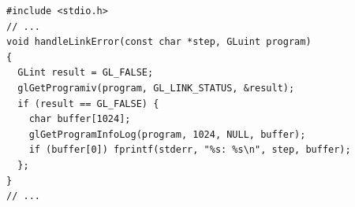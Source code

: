 \documentclass[calcdimensions,landscape,letterpaper]{powersem}
\newcommand{\thecurrentheading}{}
\newcommand{\heading}[1]{\renewcommand{\thecurrentheading}{#1}}
\begin{document}
\begin{slide}
    \heading{Minimal Pipeline: Link Errors}
    \begin{center}
        \begin{minipage}[c]{.95\textwidth}
            \begin{verbatim}
#include <stdio.h>
// ...
void handleLinkError(const char *step, GLuint program)
{
  GLint result = GL_FALSE;
  glGetProgramiv(program, GL_LINK_STATUS, &result);
  if (result == GL_FALSE) {
    char buffer[1024];
    glGetProgramInfoLog(program, 1024, NULL, buffer);
    if (buffer[0]) fprintf(stderr, "%s: %s\n", step, buffer);
  };
}
// ...
            \end{verbatim}
        \end{minipage}
    \end{center}
\end{slide}
\end{document}
